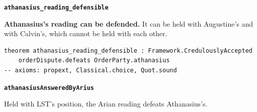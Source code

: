 \documentclass[11pt,paper=\testimonypaper,DIV=13,parskip=false]{scrartcl}
\begin{document}
\par\medskip\noindent\textbf{\texttt{athanasius\_\allowbreak{}reading\_\allowbreak{}defensible}}\par\nobreak\noindent
\textbf{Athanasius’s reading can be defended.} It can be held with Augustine’s and with Calvin’s, which cannot be held with each other.

{\small\begin{verbatim}
theorem athanasius_reading_defensible : Framework.CredulouslyAccepted
    orderDispute.defeats OrderParty.athanasius
-- axioms: propext, Classical.choice, Quot.sound
\end{verbatim}}
\par\medskip\noindent\textbf{\texttt{athanasius\allowbreak{}Answered\allowbreak{}By\allowbreak{}Arius}}\par\nobreak\noindent
Held with LST’s position, the Arian reading defeats Athanasius’s.
\end{document}
